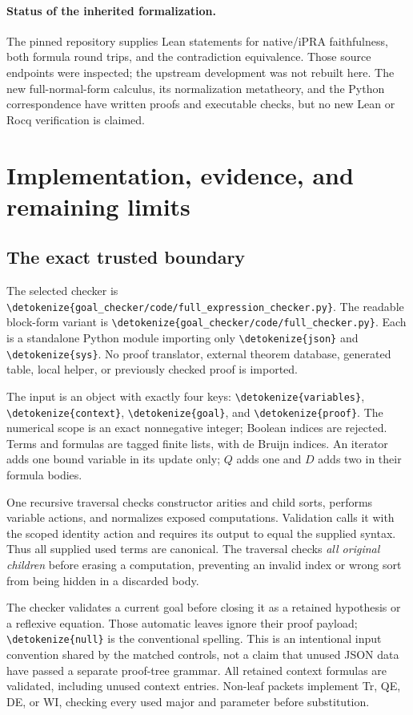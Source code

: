 \documentclass[11pt,letterpaper]{article}
\theoremstyle{definition}
\theoremstyle{remark}
\newcommand{\file}[1]{\expandafter\nolinkurl\expandafter{\detokenize{#1}}}
\begin{document}
\paragraph{Status of the inherited formalization.}
The pinned repository supplies Lean statements for native/iPRA
faithfulness, both formula round trips, and the contradiction equivalence.
Those source endpoints were inspected; the upstream development was
not rebuilt here. The new full-normal-form calculus, its normalization
metatheory, and the Python correspondence have written proofs and
executable checks, but no new Lean or Rocq verification is claimed.

\section{Implementation, evidence, and remaining limits}
\label{sec:implementation}

\subsection{The exact trusted boundary}

The selected checker is
\file{goal_checker/code/full_expression_checker.py}.
The readable block-form variant is
\file{goal_checker/code/full_checker.py}.
Each is a standalone Python module importing only \file{json} and
\file{sys}. No proof translator, external theorem database, generated
table, local helper, or previously checked proof is imported.

The input is an object with exactly four keys:
\file{variables}, \file{context}, \file{goal}, and \file{proof}.
The numerical scope is an exact nonnegative integer; Boolean indices
are rejected. Terms and formulas are tagged finite lists, with de Bruijn
indices. An iterator adds one bound variable in its update only;
$Q$ adds one and $D$ adds two in their formula bodies.

One recursive traversal checks constructor arities and child sorts,
performs variable actions, and normalizes exposed computations.
Validation calls it with the scoped identity action and requires its
output to equal the supplied syntax. Thus all supplied used terms
are canonical. The traversal checks \emph{all original children}
before erasing a computation, preventing an invalid index or wrong
sort from being hidden in a discarded body.

The checker validates a current goal before closing it as a retained
hypothesis or a reflexive equation. Those automatic leaves ignore
their proof payload; \file{null} is the conventional spelling.
This is an intentional input convention shared by the matched controls,
not a claim that unused JSON data have passed a separate proof-tree
grammar. All retained context formulas are validated, including
unused context entries. Non-leaf packets implement Tr, QE, DE,
or WI, checking every used major and parameter before substitution.
\end{document}

